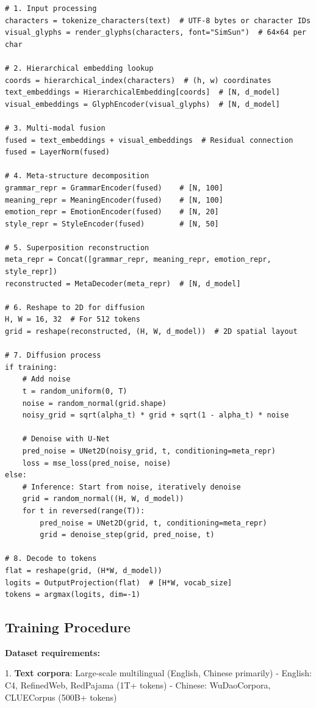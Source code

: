 \documentclass[11pt]{article}
\begin{document}
\begin{verbatim}
# 1. Input processing
characters = tokenize_characters(text)  # UTF-8 bytes or character IDs
visual_glyphs = render_glyphs(characters, font="SimSun")  # 64×64 per char

# 2. Hierarchical embedding lookup
coords = hierarchical_index(characters)  # (h, w) coordinates
text_embeddings = HierarchicalEmbedding[coords]  # [N, d_model]
visual_embeddings = GlyphEncoder(visual_glyphs)  # [N, d_model]

# 3. Multi-modal fusion
fused = text_embeddings + visual_embeddings  # Residual connection
fused = LayerNorm(fused)

# 4. Meta-structure decomposition
grammar_repr = GrammarEncoder(fused)    # [N, 100]
meaning_repr = MeaningEncoder(fused)    # [N, 100]
emotion_repr = EmotionEncoder(fused)    # [N, 20]
style_repr = StyleEncoder(fused)        # [N, 50]

# 5. Superposition reconstruction
meta_repr = Concat([grammar_repr, meaning_repr, emotion_repr, style_repr])
reconstructed = MetaDecoder(meta_repr)  # [N, d_model]

# 6. Reshape to 2D for diffusion
H, W = 16, 32  # For 512 tokens
grid = reshape(reconstructed, (H, W, d_model))  # 2D spatial layout

# 7. Diffusion process
if training:
    # Add noise
    t = random_uniform(0, T)
    noise = random_normal(grid.shape)
    noisy_grid = sqrt(alpha_t) * grid + sqrt(1 - alpha_t) * noise

    # Denoise with U-Net
    pred_noise = UNet2D(noisy_grid, t, conditioning=meta_repr)
    loss = mse_loss(pred_noise, noise)
else:
    # Inference: Start from noise, iteratively denoise
    grid = random_normal((H, W, d_model))
    for t in reversed(range(T)):
        pred_noise = UNet2D(grid, t, conditioning=meta_repr)
        grid = denoise_step(grid, pred_noise, t)

# 8. Decode to tokens
flat = reshape(grid, (H*W, d_model))
logits = OutputProjection(flat)  # [H*W, vocab_size]
tokens = argmax(logits, dim=-1)
\end{verbatim}

\subsection*{Training Procedure}

\textbf{Dataset requirements:}

1. \textbf{Text corpora}: Large-scale multilingual (English, Chinese primarily)
   - English: C4, RefinedWeb, RedPajama (1T+ tokens)
   - Chinese: WuDaoCorpora, CLUECorpus (500B+ tokens)
\end{document}
